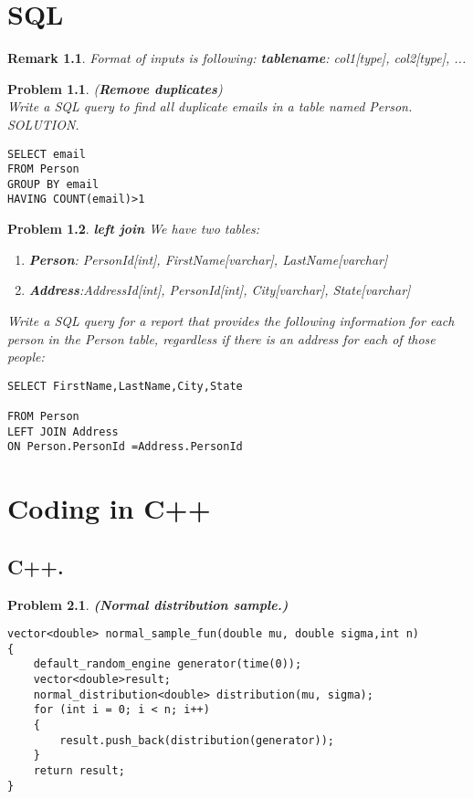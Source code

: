 \documentclass{book}
\newtheorem{remark}{Remark}[section]
\newtheorem{problem}{Problem}[section]
\begin{document}
\chapter{SQL }
\begin{remark}
Format of inputs is following: \textbf{tablename}: col1[type], col2[type], ...
 
\end{remark}
\begin{problem}(\textbf{Remove duplicates})\\
Write a SQL query to find all duplicate emails in a table named Person.\\
SOLUTION.
\begin{verbatim}
SELECT email
FROM Person
GROUP BY email
HAVING COUNT(email)>1
\end{verbatim}
\end{problem}
\begin{problem}\textbf{left join}
We have two tables:
\begin{enumerate}
\item  \textbf{Person}: PersonId[int], FirstName[varchar], LastName[varchar]
\item \textbf{ Address}:AddressId[int], PersonId[int], City[varchar], State[varchar]
\end{enumerate}
Write a SQL query for a report that provides the following information for each person in the Person table, regardless if there is an address for each of those people:
\begin{verbatim}
SELECT FirstName,LastName,City,State

FROM Person
LEFT JOIN Address
ON Person.PersonId =Address.PersonId
\end{verbatim}
\end{problem}

\chapter{Coding in C++}
\section{C++.}
\begin{problem}\textbf{(Normal distribution sample.)}
\begin{verbatim}
vector<double> normal_sample_fun(double mu, double sigma,int n)
{
	default_random_engine generator(time(0));
	vector<double>result;
	normal_distribution<double> distribution(mu, sigma);
	for (int i = 0; i < n; i++)
	{
		result.push_back(distribution(generator));
	}
	return result;
}
\end{verbatim}
\end{problem}
\end{document}

